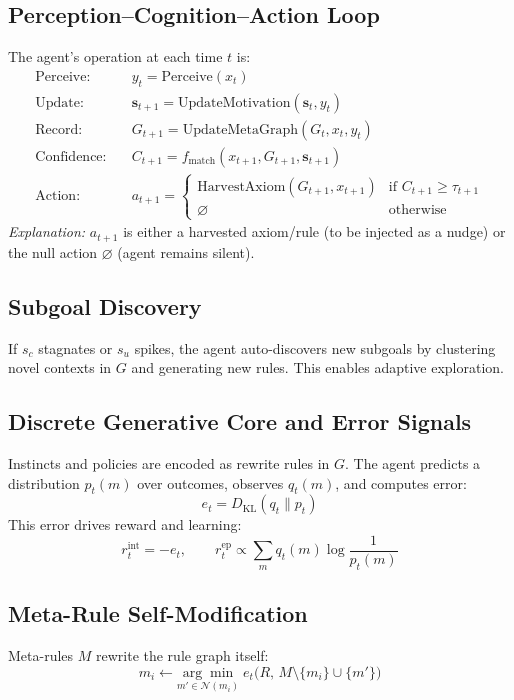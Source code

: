 \documentclass[11pt]{article}
\begin{document}
\subsection{Perception--Cognition--Action Loop}
The agent's operation at each time $t$ is:
\begin{align*}
  \text{Perceive:} &\quad y_t = \mathrm{Perceive}(x_t) \\
  \text{Update:} &\quad \mathbf{s}_{t+1} = \mathrm{UpdateMotivation}(\mathbf{s}_t, y_t) \\
  \text{Record:} &\quad G_{t+1} = \mathrm{UpdateMetaGraph}(G_t, x_t, y_t) \\
  \text{Confidence:} &\quad C_{t+1} = f_\mathrm{match}(x_{t+1}, G_{t+1}, \mathbf{s}_{t+1}) \\
  \text{Action:} &\quad a_{t+1} = \begin{cases}
    \mathrm{HarvestAxiom}(G_{t+1}, x_{t+1}) & \text{if } C_{t+1} \geq \tau_{t+1} \\
    \varnothing & \text{otherwise}
  \end{cases}
\end{align*}
\textit{Explanation:} $a_{t+1}$ is either a harvested axiom/rule (to be injected as a nudge) or the null action $\varnothing$ (agent remains silent).

\subsection{Subgoal Discovery}
If $s_c$ stagnates or $s_u$ spikes, the agent auto-discovers new subgoals by clustering novel contexts in $G$ and generating new rules. This enables adaptive exploration.

\subsection{Discrete Generative Core and Error Signals}
Instincts and policies are encoded as rewrite rules in $G$. The agent predicts a distribution $p_t(m)$ over outcomes, observes $q_t(m)$, and computes error:
\[
  e_t = D_{\mathrm{KL}}(q_t\|p_t)
\]
This error drives reward and learning:
\[
  r^{\mathrm{int}}_t = -e_t, \qquad r^{\mathrm{ep}}_t \propto \sum_m q_t(m)\log\frac{1}{p_t(m)}
\]

\subsection{Meta-Rule Self-Modification}
Meta-rules $M$ rewrite the rule graph itself:
\[
  m_i \leftarrow \underset{m'\in\mathcal{N}(m_i)}{\arg\min}\;e_t\bigl(R,\,M\setminus\{m_i\}\cup\{m'\}\bigr)
\]
\end{document}
